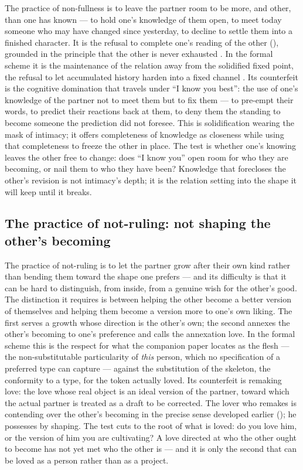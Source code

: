 The practice of non-fullness is to leave the partner room to be more, and other, than one has known --- to hold one's knowledge of them open, to meet today someone who may have changed since yesterday, to decline to settle them into a finished character. It is the refusal to complete one's reading of the other (), grounded in the principle that the other is never exhausted \parencite{paperxix}. In the formal scheme it is the maintenance of the relation away from the solidified fixed point, the refusal to let accumulated history harden into a fixed channel \parencite{wan2026braid}. Its counterfeit is the cognitive domination that travels under ``I know you best'': the use of one's knowledge of the partner not to meet them but to fix them --- to pre-empt their words, to predict their reactions back at them, to deny them the standing to become someone the prediction did not foresee. This is solidification wearing the mask of intimacy; it offers completeness of knowledge as closeness while using that completeness to freeze the other in place. The test is whether one's knowing leaves the other free to change: does ``I know you'' open room for who they are becoming, or nail them to who they have been? Knowledge that forecloses the other's revision is not intimacy's depth; it is the relation setting into the shape it will keep until it breaks.

\subsection{The practice of not-ruling: not shaping the other's becoming}
\label{p20:sub:practice-buzai}

The practice of not-ruling is to let the partner grow after their own kind rather than bending them toward the shape one prefers --- and its difficulty is that it can be hard to distinguish, from inside, from a genuine wish for the other's good. The distinction it requires is between helping the other become a better version of themselves and helping them become a version more to one's own liking. The first serves a growth whose direction is the other's own; the second annexes the other's becoming to one's preference and calls the annexation love. In the formal scheme this is the respect for what the companion paper locates as the flesh --- the non-substitutable particularity of \emph{this} person, which no specification of a preferred type can capture \parencite{wan2026braid} --- against the substitution of the skeleton, the conformity to a type, for the token actually loved. Its counterfeit is remaking love: the love whose real object is an ideal version of the partner, toward which the actual partner is treated as a draft to be corrected. The lover who remakes is contending over the other's becoming in the precise sense developed earlier (); he possesses by shaping. The test cuts to the root of what is loved: do you love him, or the version of him you are cultivating? A love directed at who the other ought to become has not yet met who the other is --- and it is only the second that can be loved as a person rather than as a project.

